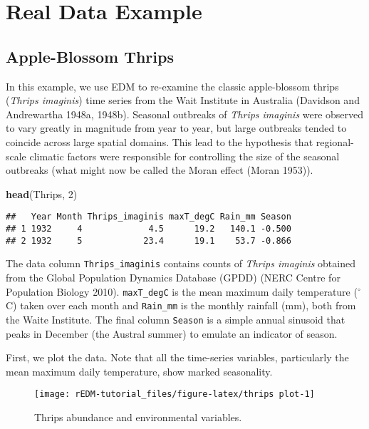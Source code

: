 \documentclass[]{article}
\newenvironment{Shaded}{\begin{snugshade}}{\end{snugshade}}
\newcommand{\DecValTok}[1]{\textcolor[rgb]{0.00,0.00,0.81}{#1}}
\newcommand{\KeywordTok}[1]{\textcolor[rgb]{0.13,0.29,0.53}{\textbf{#1}}}
\newcommand{\NormalTok}[1]{#1}
\begin{document}
\hypertarget{real-data-example}{%
\section{Real Data Example}\label{real-data-example}}

\hypertarget{apple-blossom-thrips}{%
\subsection{Apple-Blossom Thrips}\label{apple-blossom-thrips}}

In this example, we use EDM to re-examine the classic apple-blossom
thrips (\emph{Thrips imaginis}) time series from the Wait Institute in
Australia (Davidson and Andrewartha 1948a, 1948b). Seasonal outbreaks of
\emph{Thrips imaginis} were observed to vary greatly in magnitude from
year to year, but large outbreaks tended to coincide across large
spatial domains. This lead to the hypothesis that regional-scale
climatic factors were responsible for controlling the size of the
seasonal outbreaks (what might now be called the Moran effect (Moran
1953)).

\begin{Shaded}
\begin{Highlighting}[]
\KeywordTok{head}\NormalTok{(Thrips, }\DecValTok{2}\NormalTok{)}
\end{Highlighting}
\end{Shaded}

\begin{verbatim}
##   Year Month Thrips_imaginis maxT_degC Rain_mm Season
## 1 1932     4             4.5      19.2   140.1 -0.500
## 2 1932     5            23.4      19.1    53.7 -0.866
\end{verbatim}

The data column \texttt{Thrips\_imaginis} contains counts of
\emph{Thrips imaginis} obtained from the Global Population Dynamics
Database (GPDD) (NERC Centre for Population Biology 2010).
\texttt{maxT\_degC} is the mean maximum daily temperature (\(^\circ\)C)
taken over each month and \texttt{Rain\_mm} is the monthly rainfall
(mm), both from the Waite Institute. The final column \texttt{Season} is
a simple annual sinusoid that peaks in December (the Austral summer) to
emulate an indicator of season.

First, we plot the data. Note that all the time-series variables,
particularly the mean maximum daily temperature, show marked
seasonality.

\begin{figure}[h]

{\centering \texttt{[image: rEDM-tutorial\_files/figure-latex/thrips plot-1]} 

}

\caption{Thrips abundance and environmental variables.}\label{fig:thrips plot}
\end{figure}
\end{document}
